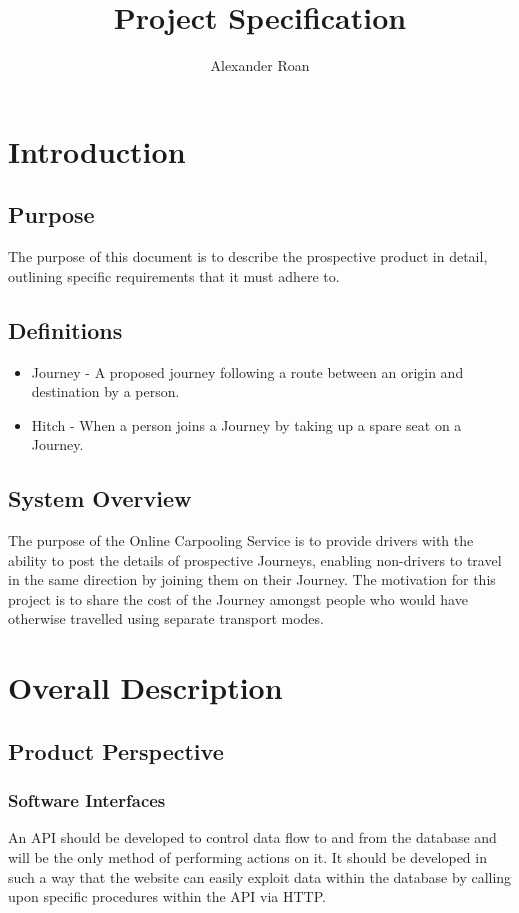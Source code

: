\documentclass[11pt]{article}
\begin{document}
\begin{titlepage}
\title{Project Specification}
\author{Alexander Roan}
\maketitle
\end{titlepage}

\tableofcontents
\newpage
\section{Introduction}

\subsection{Purpose}
The purpose of this document is to describe the prospective product in detail, outlining specific requirements that it must adhere to.

\subsection{Definitions}
\begin{itemize}
\item Journey - A proposed journey following a route between an origin and destination by a person.
\item Hitch - When a person joins a Journey by taking up a spare seat on a Journey.
\end{itemize}

\subsection{System Overview}
The purpose of the Online Carpooling Service is to provide drivers with the ability to post the details of prospective Journeys, enabling non-drivers to travel in the same direction by joining them on their Journey. The motivation for this project is to share the cost of the Journey amongst people who would have otherwise travelled using separate transport modes.


\section{Overall Description}
\subsection{Product Perspective}
\subsubsection{Software Interfaces}
An API should be developed to control data flow to and from the database and will be the only method of performing actions on it. It should be developed in such a way that the website can easily exploit data within the database by calling upon specific procedures within the API via HTTP.
\end{document}
